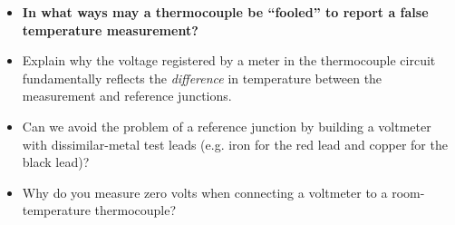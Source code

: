 \begin{itemize}
\item{} {\bf In what ways may a thermocouple be ``fooled'' to report a false temperature measurement?}
\item{} Explain why the voltage registered by a meter in the thermocouple circuit fundamentally reflects the {\it difference} in temperature between the measurement and reference junctions.
\item{} Can we avoid the problem of a reference junction by building a voltmeter with dissimilar-metal test leads (e.g. iron for the red lead and copper for the black lead)?
\item{} Why do you measure zero volts when connecting a voltmeter to a room-temperature thermocouple?
\end{itemize}




